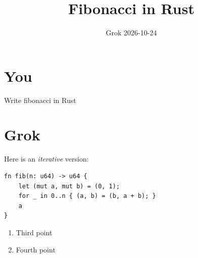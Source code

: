 \documentclass[11pt,a4paper]{article}
\title{Fibonacci in Rust}
\date{Grok \textperiodcentered{} 2026-10-24}
\begin{document}
\maketitle

\section*{You}

Write fibonacci in Rust


\section*{Grok}

Here is an \emph{iterative} version:

\begin{lstlisting}
fn fib(n: u64) -> u64 {
    let (mut a, mut b) = (0, 1);
    for _ in 0..n { (a, b) = (b, a + b); }
    a
}
\end{lstlisting}

\begin{enumerate}[start=3]
  \item Third point
  \item Fourth point
\end{enumerate}
\end{document}
